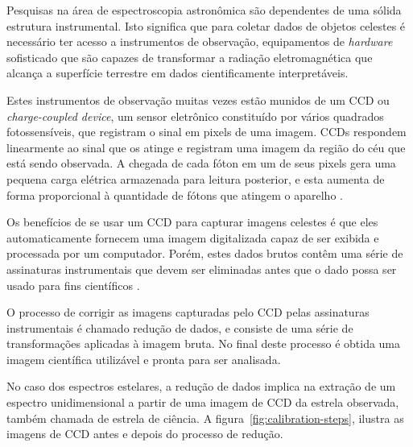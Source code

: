 Pesquisas na área de espectroscopia astronômica são dependentes de uma sólida estrutura instrumental. Isto significa que para coletar dados de objetos celestes é necessário ter acesso a instrumentos de observação, equipamentos de \textit{hardware} sofisticado que são capazes de transformar a radiação eletromagnética que alcança a superfície terrestre em dados cientificamente interpretáveis.

Estes instrumentos de observação muitas vezes estão munidos de um CCD ou \textit{charge-coupled device}, um sensor eletrônico constituído por vários quadrados fotossensíveis, que registram o sinal em pixels de uma imagem. CCDs respondem linearmente ao sinal que os atinge e registram uma imagem da região do céu que está sendo observada. A chegada de cada fóton em um de seus pixels gera uma pequena carga elétrica armazenada para leitura posterior, e esta aumenta de forma proporcional à quantidade de fótons que atingem o aparelho \citep{davenhall20012}.

Os benefícios de se usar um CCD para capturar imagens celestes é que eles automaticamente fornecem uma imagem digitalizada capaz de ser exibida e processada por um computador. Porém, estes dados brutos contêm uma série de assinaturas instrumentais que devem ser eliminadas antes que o dado possa ser usado para fins científicos \citep{davenhall20012}.  

O processo de corrigir as imagens capturadas pelo CCD pelas assinaturas instrumentais é chamado redução de dados, e consiste de uma série de transformações aplicadas à imagem bruta. No final deste processo é obtida uma imagem científica utilizável e pronta para ser analisada.

No caso dos espectros estelares, a redução de dados implica na extração de um espectro unidimensional a partir de uma imagem de CCD da estrela observada, também chamada de estrela de ciência. A figura~\ref{fig:calibration-steps}, ilustra as imagens de CCD antes e depois do processo de redução.


